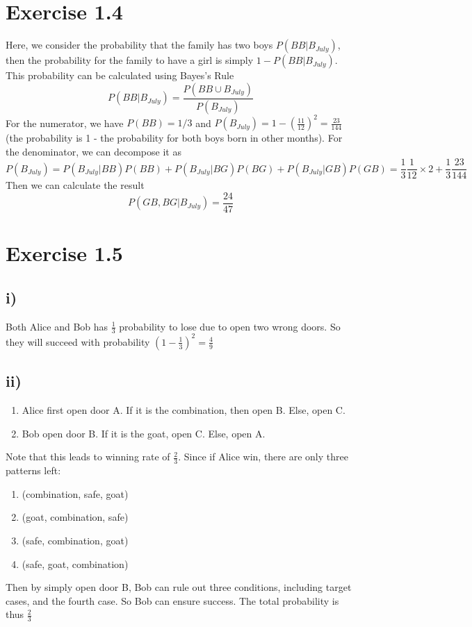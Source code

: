 \documentclass[12pt]{report}
\begin{document}
\section*{Exercise 1.4}
Here, we consider the probability that the family has two boys $P(BB|B_{July})$, then the probability for the family to have a girl is 
simply $1-P(BB|B_{July})$.
This probability can be calculated using Bayes's Rule
$$
    P(BB|B_{July}) = \frac{P(BB \cup B_{July})}{P(B_{July})}
$$
For the numerator, we have
$P(BB) = 1/3$ and $P(B_{July}) = 1 - (\frac{11}{12})^{2} = \frac{23}{144}$ (the probability is 1 - the probability for both boys born in other months).
For the denominator, we can decompose it as 
$$
    P(B_{July}) = P(B_{July}|BB)P(BB) + P(B_{July}|BG)P(BG) + P(B_{July}|GB)P(GB) = \frac{1}{3}\frac{1}{12} \times 2 + \frac{1}{3}\frac{23}{144}
$$
Then we can calculate the result
$$
    P(GB,BG|B_{July}) = \frac{24}{47}
$$\cite{article}

\section*{Exercise 1.5}
\subsection*{i)}
Both Alice and Bob has $\frac{1}{3}$ probability to lose due to open two wrong doors. So they will succeed with probability $(1-\frac{1}{3})^{2} = \frac{4}{9}$

\subsection*{ii)}
\begin{enumerate}
    \item Alice first open door A. If it is the combination, then open B. Else, open C.
    \item Bob open door B. If it is the goat, open C. Else, open A.
\end{enumerate}
Note that this leads to winning rate of $\frac{2}{3}$. Since if Alice win, there are only three patterns left:
\begin{enumerate}
    \item (combination, safe, goat)
    \item (goat, combination, safe)
    \item (safe, combination, goat)
    \item (safe, goat, combination)
\end{enumerate}
Then by simply open door B, Bob can rule out three conditions, including target cases, and the fourth case.
So Bob can ensure success. The total probability is thus $\frac{2}{3}$
\end{document}

